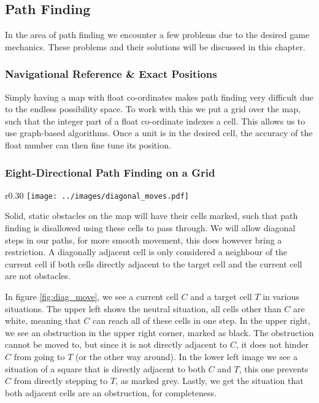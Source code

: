 \subsection{Path Finding}
In the area of path finding we encounter a few problems due to the desired game mechanics. These problems and their solutions will be discussed in this chapter.

\subsubsection{Navigational Reference \& Exact Positions}
Simply having a map with float co-ordinates makes path finding very difficult due to the endless possibility space. To work with this we put a grid over the map, such that the integer part of a float co-ordinate indexes a cell. This allows us to use graph-based algorithms. Once a unit is in the desired cell, the accuracy of the float number can then fine tune its position.

\subsubsection{Eight-Directional Path Finding on a Grid}
\begin{wrapfigure}{r}{0.30\textwidth}
\texttt{[image: ../images/diagonal\_moves.pdf]}
\caption{Diagonal movement}
\label{fig:diag_move}
\end{wrapfigure}

Solid, static obstacles on the map will have their cells marked, such that path finding is disallowed using these cells to pass through. We will allow diagonal steps in our paths, for more smooth movement, this does however bring a restriction. A diagonally adjacent cell is only considered a neighbour of the current cell if both cells directly adjacent to the target cell and the current cell are not obstacles. 

In figure \ref{fig:diag_move}, we see a current cell $C$ and a target cell $T$ in various situations. The upper left shows the neutral situation, all cells other than $C$ are white, meaning that $C$ can reach all of these cells in one step. In the upper right, we see an obstruction in the upper right corner, marked as black. The obstruction cannot be moved to, but since it is not directly adjacent to $C$, it does not hinder $C$ from going to $T$ (or the other way around). In the lower left image we see a situation of a square that is directly adjacent to both $C$ and $T$, this one prevents $C$ from directly stepping to $T$, as marked grey. Lastly, we get the situation that both adjacent cells are an obstruction, for completeness.

